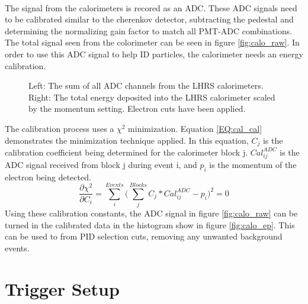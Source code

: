 	\paragraph{} The signal from the calorimeters is recored as an ADC. These ADC signals need to be calibrated similar to the cherenkov detector, subtracting the pedestal and determining the normalizing gain factor to match all PMT-ADC combinations. The total signal seen from the colorimeter can be seen in figure \ref{fig:calo_raw}. In order to use this ADC signal to help ID particles, the calorimeter needs an energy calibration. 
	\begin{figure}[t]
		\centering
		\hspace*{-65pt}
		\centering	
		\caption{Left: The sum of all ADC channels from the LHRS calorimeters. Right: The total energy deposited into the LHRS calorimeter scaled by the momentum setting. Electron cuts have been applied.}
	\end{figure}
	The calibration process uses a $\chi^2$ minimization. Equation \ref{EQ:cal_cal} demonstrates the minimization technique applied. In this equation, $C_j$ is the calibration coefficient being determined for the calorimeter block j. $Cal^{ADC}_{ij}$ is the ADC signal received from block j during event i, and $p_i$ is the momentum of the electron being detected. 
	\begin{equation}
		\frac{\partial\chi^2}{\partial C_i} = \sum\limits_{i}^{Events} \bigg( \sum\limits_{j}^{Blocks}C_{j}*Cal^{ADC}_{ij} - p_i  \bigg)^2 = 0 
		\label{EQ:cal_cal}
	\end{equation}
	Using these calibration constants, the ADC signal in figure \ref{fig:calo_raw} can be turned in the calibrated data in the histogram show in figure \ref{fig:calo_ep}. This can be used to from PID selection cuts, removing any unwanted background events.  
	
\section{Trigger Setup}\label{sec:Trig}
